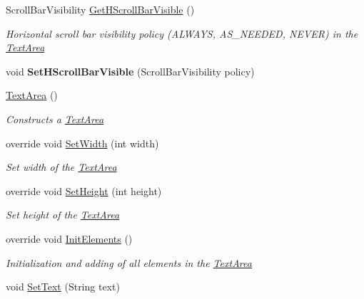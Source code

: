 \begin{DoxyCompactItemize}
\item 
Scroll\+Bar\+Visibility \mbox{\hyperlink{class_space_v_i_l_1_1_text_area_a86dde8ef01a88822f95df395742f2438}{Get\+H\+Scroll\+Bar\+Visible}} ()
\begin{DoxyCompactList}\small\item\em Horizontal scroll bar visibility policy (A\+L\+W\+A\+YS, A\+S\+\_\+\+N\+E\+E\+D\+ED, N\+E\+V\+ER) in the \mbox{\hyperlink{class_space_v_i_l_1_1_text_area}{Text\+Area}} \end{DoxyCompactList}\item 
\mbox{\label{class_space_v_i_l_1_1_text_area_aa5e2dc30608427d9ec05b6d434b2d925}} 
void {\bfseries Set\+H\+Scroll\+Bar\+Visible} (Scroll\+Bar\+Visibility policy)
\item 
\mbox{\hyperlink{class_space_v_i_l_1_1_text_area_a1450947f3404821d0242263470641c75}{Text\+Area}} ()
\begin{DoxyCompactList}\small\item\em Constructs a \mbox{\hyperlink{class_space_v_i_l_1_1_text_area}{Text\+Area}} \end{DoxyCompactList}\item 
override void \mbox{\hyperlink{class_space_v_i_l_1_1_text_area_a214e3d5afc4c12519fb8594dce699ef0}{Set\+Width}} (int width)
\begin{DoxyCompactList}\small\item\em Set width of the \mbox{\hyperlink{class_space_v_i_l_1_1_text_area}{Text\+Area}} \end{DoxyCompactList}\item 
override void \mbox{\hyperlink{class_space_v_i_l_1_1_text_area_abb58c3f9396680f5d2c7f238c0d6e0bb}{Set\+Height}} (int height)
\begin{DoxyCompactList}\small\item\em Set height of the \mbox{\hyperlink{class_space_v_i_l_1_1_text_area}{Text\+Area}} \end{DoxyCompactList}\item 
override void \mbox{\hyperlink{class_space_v_i_l_1_1_text_area_a1d7971411658c81ed831c91958df7ade}{Init\+Elements}} ()
\begin{DoxyCompactList}\small\item\em Initialization and adding of all elements in the \mbox{\hyperlink{class_space_v_i_l_1_1_text_area}{Text\+Area}} \end{DoxyCompactList}\item 
void \mbox{\hyperlink{class_space_v_i_l_1_1_text_area_a5c1fcd7e4bcf6c9a508d997f59b27bcb}{Set\+Text}} (String text)

\end{DoxyCompactItemize}
